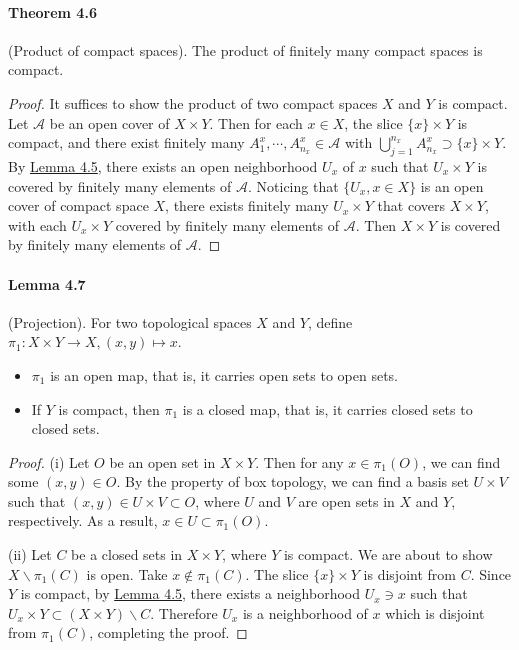 \documentclass{article}
\numberwithin{equation}{section}
\theoremstyle{plain}
\theoremstyle{definition}
\begin{document}
\paragraph{Theorem 4.6\label{thm:4.6}} (Product of compact spaces). The product of finitely many compact spaces is compact.
\begin{proof}
It suffices to show the product of two compact spaces $X$ and $Y$ is compact. Let $\mathscr{A}$ be an open cover of $X\times Y$. Then for each $x\in X$, the slice $\{x\}\times Y$ is compact, and there exist finitely many $A_1^x,\cdots,A_{n_x}^x\in\mathscr{A}$ with $\bigcup_{j=1}^{n_x}A_{n_x}^x\supset \{x\}\times Y$. By \hyperref[lemma:4.5]{Lemma 4.5}, there exists an open neighborhood $U_x$ of $x$ such that $U_x\times Y$ is covered by finitely many elements of $\mathscr{A}$. Noticing that $\{U_x,x\in X\}$ is an open cover of compact space $X$, there exists finitely many $U_x\times Y$ that covers $X\times Y$, with each $U_x\times Y$ covered by finitely many elements of $\mathscr{A}$. Then $X\times Y$ is covered by finitely many elements of $\mathscr{A}$.
\end{proof}

\paragraph{Lemma 4.7\label{lemma:4.7}} (Projection). For two topological spaces $X$ and $Y$, define $\pi_1:X\times Y\to X,(x,y)\mapsto x$.
\begin{itemize}
	\item[(i)] $\pi_1$ is an open map, that is, it carries open sets to open sets.
	\item[(ii)] If $Y$ is compact, then $\pi_1$ is a closed map, that is, it carries closed sets to closed sets.
\end{itemize}
\begin{proof}
(i) Let $O$ be an open set in $X\times Y$. Then for any $x\in \pi_1(O)$, we can find some $(x,y)\in O$. By the property of box topology, we can find a basis set $U\times V$ such that $(x,y)\in U\times V\subset O$, where $U$ and $V$ are open sets in $X$ and $Y$, respectively. As a result, $x\in U \subset \pi_1(O)$.

(ii) Let $C$ be a closed sets in $X\times Y$, where $Y$ is compact. We are about to show $X\backslash\pi_1(C)$ is open. Take $x\notin\pi_1(C)$. The slice $\{x\}\times Y$ is disjoint from $C$. Since $Y$ is compact, by \hyperref[lemma:4.5]{Lemma 4.5}, there exists a neighborhood $U_x\ni x$ such that $U_x\times Y\subset( X\times Y)\backslash C$. Therefore $U_x$ is a neighborhood of $x$ which is disjoint from $\pi_1(C)$, completing the proof.
\end{proof}
\end{document}
